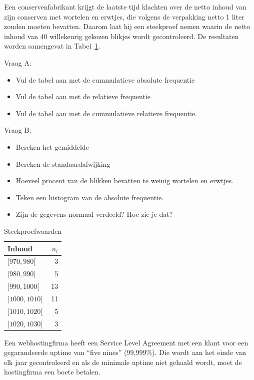 {\begin{exercise}
  Een conservenfabrikant krijgt de laatste tijd klachten over de netto inhoud van zijn conserven met wortelen en erwtjes, die volgens de verpakking netto 1 liter zouden moeten bevatten. Daarom laat hij een steekproef nemen waarin de netto inhoud van 40 willekeurig gekozen blikjes wordt gecontroleerd. De resultaten worden samengevat in Tabel~\ref{tab:Steekproefwaarden}.

Vraag A: 
\begin{itemize}
  \item Vul de tabel aan met de cummulatieve absolute frequentie
  \item Vul de tabel aan met de relatieve frequentie
  \item Vul de tabel aan met de cummulatieve relatieve frequentie.
\end{itemize}
Vraag B:

\begin{itemize}
  \item Bereken het gemiddelde
  \item Bereken de standaardafwijking
  \item Hoeveel procent van de blikken bevatten te weinig wortelen en erwtjes.
  \item Teken een histogram van de absolute frequentie.
  \item Zijn de gegevens normaal verdeeld?  Hoe zie je dat?
\end{itemize}

\end{exercise}

  \begin{table}
  \centering
  \begin{tabular}{lr}
    \toprule
    Inhoud & $n_{i}$ \\
    \midrule
    $[970,980[$ & 3 \\
    $[980,990[$ & 5 \\
    $[990,1000[$ & 13 \\
    $[1000,1010[$ & 11 \\ 
    $[1010,1020[$ & 5 \\
    $[1020,1030[$ & 3 \\
    \bottomrule
  \end{tabular}
  \caption{Steekproefwaarden}
  \label{tab:Steekproefwaarden}
\end{table}

\begin{exercise}
  Een webhostingfirma heeft een Service Level Agreement met een klant voor een gegarandeerde uptime van ``five nines'' (99,999\%).  Die wordt aan het einde van elk jaar gecontroleerd en als de minimale uptime niet gehaald wordt, moet de hostingfirma een boete betalen.
  

\end{exercise}}
